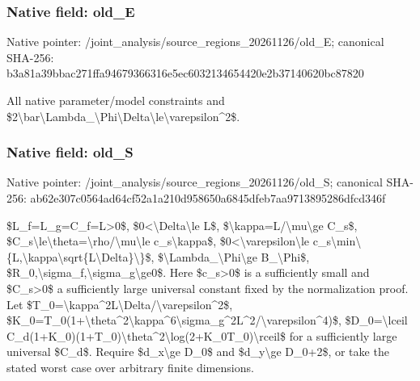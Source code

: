 \documentclass[10pt,a4paper]{article}
\begin{document}
\subsubsection{Native field: old\_E}


Native pointer: /joint\_analysis/source\_r\allowbreak{}egions\_20261126/old\_E; canonical SHA-256: b3a81a39bbac271ffa946793\allowbreak{}66316e5ec6032134654420e2\allowbreak{}b37140620bc87820


All native parameter/model constraints and \$2\textbackslash{}bar\textbackslash{}Lambda\_\textbackslash{}Phi\textbackslash{}Delta\allowbreak{}\textbackslash{}le\textbackslash{}varepsilon\textasciicircum{}2\$.


\subsubsection{Native field: old\_S}


Native pointer: /joint\_analysis/source\_r\allowbreak{}egions\_20261126/old\_S; canonical SHA-256: ab62e307c0564ad64cf52a1a\allowbreak{}210d958650a6845dfeb7aa97\allowbreak{}13895286dfcd346f


\$L\_f=L\_g=C\_f=L>0\$, \$0<\textbackslash{}Delta\textbackslash{}le L\$, \$\textbackslash{}kappa=L/\textbackslash{}mu\textbackslash{}ge C\_s\$, \$C\_s\textbackslash{}le\textbackslash{}theta=\textbackslash{}rho/\textbackslash{}mu\textbackslash{}le c\_s\textbackslash{}kappa\$, \$0<\textbackslash{}varepsilon\textbackslash{}le c\_s\textbackslash{}min\textbackslash{}\{L,\textbackslash{}kappa\textbackslash{}sqrt\{L\textbackslash{}Delta\}\textbackslash{}\}\$, \$\textbackslash{}Lambda\_\textbackslash{}Phi\textbackslash{}ge B\_\textbackslash{}Phi\$, \$R\_0,\textbackslash{}sigma\_f,\textbackslash{}sigma\_g\textbackslash{}ge0\$. Here \$c\_s>0\$ is a sufficiently small and \$C\_s>0\$ a sufficiently large universal constant fixed by the normalization proof. Let \$T\_0=\textbackslash{}kappa\textasciicircum{}2L\textbackslash{}Delta/\textbackslash{}varepsilon\textasciicircum{}2\$, \$K\_0=T\_0(1+\textbackslash{}theta\textasciicircum{}2\textbackslash{}kapp\allowbreak{}a\textasciicircum{}6\textbackslash{}sigma\_g\textasciicircum{}2L\textasciicircum{}2/\textbackslash{}vareps\allowbreak{}ilon\textasciicircum{}4)\$, \$D\_0=\textbackslash{}lceil C\_d(1+K\_0)(1+T\_0)\textbackslash{}theta\textasciicircum{}\allowbreak{}2\textbackslash{}log(2+K\_0T\_0)\textbackslash{}rceil\$ for a sufficiently large universal \$C\_d\$. Require \$d\_x\textbackslash{}ge D\_0\$ and \$d\_y\textbackslash{}ge D\_0+2\$, or take the stated worst case over arbitrary finite dimensions.
\end{document}
